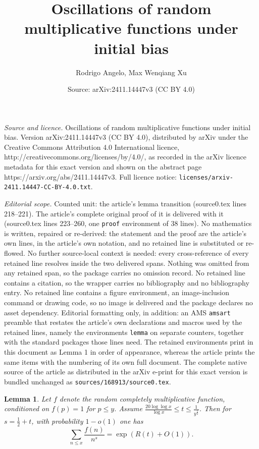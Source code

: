 \documentclass[10pt,a4paper]{amsart}
\title{Oscillations of random multiplicative functions under initial bias}
\author{Rodrigo Angelo, Max Wenqiang Xu}
\date{Source: arXiv:2411.14447v3 (CC BY 4.0)}
\newtheorem{lemma}{Lemma}
\begin{document}
\maketitle

\noindent\emph{Source and licence.} Oscillations of random multiplicative functions under initial bias. Version arXiv:2411.14447v3 (CC BY 4.0), distributed by arXiv under the Creative Commons Attribution 4.0 International licence, http://creativecommons.org/licenses/by/4.0/, as recorded in the arXiv licence metadata for this exact version and shown on the abstract page https://arxiv.org/abs/2411.14447v3. Full licence notice: \texttt{licenses/arxiv-2411.14447-CC-BY-4.0.txt}.\par\smallskip

\noindent\textit{Editorial scope.} Counted unit: the article's lemma transition (source0.tex lines 218--221). The article's complete original proof of it is delivered with it (source0.tex lines 223--260, one \texttt{proof} environment of 38 lines). No mathematics is written, repaired or re-derived: the statement and the proof are the article's own lines, in the article's own notation, and no retained line is substituted or re-flowed.  No further source-local context is needed: every cross-reference of every retained line resolves inside the two delivered spans.  Nothing was omitted from any retained span, so the package carries no omission record.  No retained line contains a citation, so the wrapper carries no bibliography and no bibliography entry.  No retained line contains a figure environment, an image-inclusion command or drawing code, so no image is delivered and the package declares no asset dependency.  Editorial formatting only, in addition: an AMS \texttt{amsart} preamble that restates the article's own declarations and macros used by the retained lines, namely the environments \texttt{lemma} on separate counters, together with the standard packages those lines need.  The retained environments print in this document as Lemma 1 in order of appearance, whereas the article prints the same items with the numbering of its own full document.  The complete native source of the article as distributed in the arXiv e-print for this exact version is bundled unchanged as \texttt{sources/168913/source0.tex}.
\begin{lemma}\label{transition} 
     Let $f$ denote the random completely multiplicative function, conditioned on $f(p) = 1$ for $p \le y$. Assume $\frac{20\log \log x}{\log x}\le t \le \frac{1}{y^{\frac{1}{2}}}$. Then for $s = \frac{1}{2} + t$, with probability $1-o(1)$ one has
$$\sum_{n \le x} \frac{f(n)}{n^s} = \exp(R(t)+O(1)).$$
\end{lemma}
\end{document}
